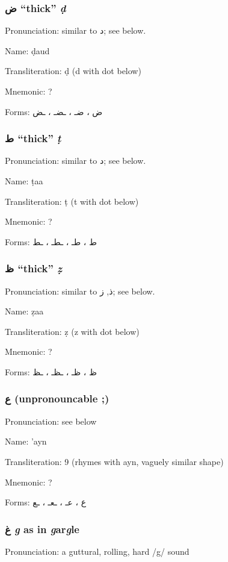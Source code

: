 \documentclass[11pt]{article}
\begin{document}
\subsubsection{ \textarabic{ض} ``thick'' \textit{ḍ}}
Pronunciation: similar to \textarabic{د}; see below.

\noindent Name: ḍaud

\noindent Transliteration: ḍ (d with dot below)

\noindent Mnemonic:  ?

\noindent Forms: \textarabic{ض ، ضـ ، ـضـ ، ـض}

\subsubsection{ \textarabic{ط} ``thick'' \textit{ṭ}}
Pronunciation: similar to \textarabic{د}; see below.

\noindent Name: ṭaa

\noindent Transliteration: ṭ (t with dot below)

\noindent Mnemonic:  ?

\noindent Forms: \textarabic{ط ، طـ ، ـطـ ، ـط}

\subsubsection{ \textarabic{ظ} ``thick'' \textit{ẓ}}
Pronunciation: similar to \textarabic{ذ}, \textarabic{ز}; see below.

\noindent Name: ẓaa

\noindent Transliteration: ẓ (z with dot below)

\noindent Mnemonic:  ?

\noindent Forms: \textarabic{ظ ، ظـ ، ـظـ ، ـظ}

\subsubsection{ \textarabic{ع} (unpronouncable ;)}
Pronunciation: see below

\noindent Name: 'ayn

\noindent Transliteration: 9 (rhymes with ayn, vaguely similar shape)

\noindent Mnemonic:  ?

\noindent Forms: \textarabic{ع ، عـ ، ـعـ ، ـع}

\subsubsection{ \textarabic{غ} \textit{g} as in \textit{g}ar\textit{g}le}
Pronunciation: a guttural, rolling, hard /g/ sound
\end{document}

